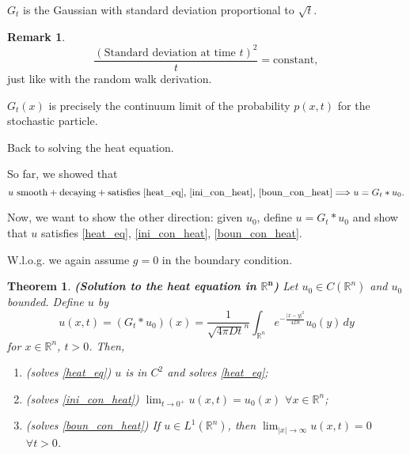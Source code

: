 \documentclass[12pt]{article}
\newtheorem{theorem}{Theorem}[section]
\theoremstyle{definition}
\newtheorem*{remark}{Remark}
\begin{document}
$G_t$ is the Gaussian with standard deviation proportional to $\sqrt t$.

\begin{remark}
\[\frac{(\text{Standard deviation at time }t)^2}t=\text{constant},\]
just like with the random walk derivation.

$G_t(x)$ is precisely the continuum limit of the probability $p(x,t)$ for the stochastic particle.
\end{remark}

Back to solving the heat equation.

So far, we showed that
\[u\text{ smooth}+\text{decaying}+\text{satisfies \eqref{heat_eq}, \eqref{ini_con_heat}, \eqref{boun_con_heat}}\Longrightarrow u=G_t*u_0.\]

Now, we want to show the other direction: given $u_0$, define $u=G_t*u_0$ and show that $u$ satisfies \eqref{heat_eq}, \eqref{ini_con_heat}, \eqref{boun_con_heat}.

W.l.o.g. we again assume $g=0$ in the boundary condition.

\begin{theorem}\label{th_sol_heat}
\emph{\textbf{(Solution to the heat equation in $\boldsymbol{\mathbb R^n}$)}} Let $u_0\in C(\mathbb R^n)$ and $u_0$ bounded. Define $u$ by
\[u(x,t)=(G_t*u_0)(x)=\frac1{\sqrt{4\pi Dt}^n}\int_{\mathbb R^n}e^{-\frac{|x-y|^2}{4Dt}}u_0(y)\,dy\]
for $x\in\mathbb R^n$, $t>0$. Then,
\begin{enumerate}[label=(\arabic*)]
\item (solves \eqref{heat_eq}) $u$ is in $C^2$ and solves \eqref{heat_eq};
\item (solves \eqref{ini_con_heat}) $\displaystyle{\lim_{t\to0^+}u(x,t)=u_0(x)}$ $\forall x\in\mathbb R^n$;
\item  (solves \eqref{boun_con_heat}) If $u\in L^1(\mathbb R^n)$, then $\displaystyle{\lim_{|x|\to\infty}u(x,t)=0}$ $\forall t>0$.
\end{enumerate}
\end{theorem}
\end{document}
